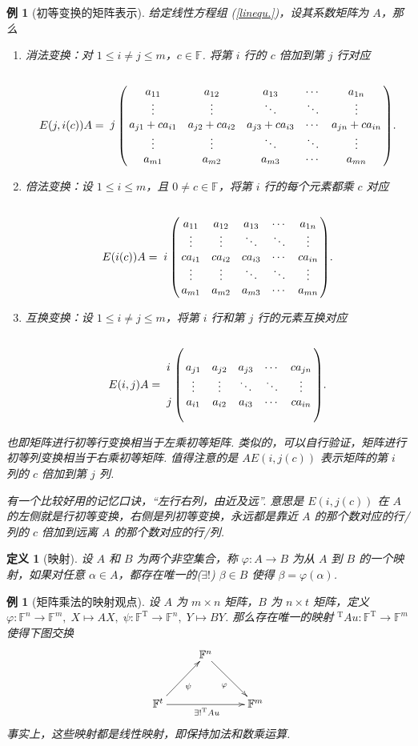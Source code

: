 \documentclass[10pt,openany]{article}
\theoremstyle{thmstyle} %
\theoremstyle{defstyle} %
\newtheorem{definition}[theorem]{定义}
\theoremstyle{prostyle} %
\theoremstyle{exastyle}
\newtheorem{example}[theorem]{例}
\theoremstyle{remstyle}
\newcommand{\T}{^{\text{T}}}
\newcommand{\F}{\mathbb{F}}
\begin{document}
\begin{example}[初等变换的矩阵表示]
	给定线性方程组 (\ref{linequ.})，设其系数矩阵为 \( A \)，那么
	\begin{enumerate}[(1)]
		\item 消法变换：对 \( 1 \leq i \neq j \leq m \)，\( c \in \F \). 将第 \( i \) 行的 \( c \) 倍加到第 \( j \) 行对应
		\[ E(j,i(c))A=\bordermatrix{
			&&&&& \cr
			&a_{11} & a_{12} & a_{13} & \cdots & a_{1n} \cr
			&\vdots & \vdots & \ddots & \ddots & \vdots \cr
			j &a_{j1}+ca_{i1} & a_{j2}+ca_{i2} & a_{j3}+ca_{i3} &  \cdots & a_{jn}+ca_{in} \cr
			&\vdots & \vdots & \ddots & \ddots & \vdots \cr
			&a_{m1} & a_{m2} & a_{m3} & \cdots & a_{mn}
		}. \]
		\item 倍法变换：设 \( 1 \leq i \leq m \)，且 \( 0 \neq c \in \F \)，将第 \( i \) 行的每个元素都乘 \( c \) 对应
		\[ E(i(c))A=\bordermatrix{
			&&&&& \cr
			&a_{11} & a_{12} & a_{13} & \cdots & a_{1n} \cr
			&\vdots & \vdots & \ddots & \ddots & \vdots \cr
			i &ca_{i1} & ca_{i2} & ca_{i3} &  \cdots & ca_{in} \cr
			&\vdots & \vdots & \ddots & \ddots & \vdots \cr
			&a_{m1} & a_{m2} & a_{m3} & \cdots & a_{mn}
		}.  \]
		\item 互换变换：设 \( 1 \leq i \neq j \leq m \)，将第 \( i \) 行和第 \( j \) 行的元素互换对应
		\[ E(i,j)A=\bordermatrix{
			&&&&& \cr
			&&&&& \cr
			i &a_{j1} & a_{j2} & a_{j3} &  \cdots & ca_{jn} \cr
			&\vdots & \vdots & \ddots & \ddots & \vdots \cr
			j &a_{i1} & a_{i2} & a_{i3} &  \cdots & ca_{in} \cr
			&&&&& 
		}.   \]
	\end{enumerate}
	
	也即矩阵进行初等行变换相当于左乘初等矩阵. 类似的，可以自行验证，矩阵进行初等列变换相当于右乘初等矩阵. 值得注意的是 \( AE(i,j(c)) \) 表示矩阵的第 \( i \) 列的 \( c \) 倍加到第 \( j \) 列. 
	
	有一个比较好用的记忆口诀，“左行右列，由近及远”. 意思是 \( E(i,j(c)) \) 在 \( A \) 的左侧就是行初等变换，右侧是列初等变换，永远都是靠近 \( A \) 的那个数对应的行/列的 \( c \) 倍加到远离 \( A \) 的那个数对应的行/列.
\end{example}

\begin{definition}[映射]
	设 \( A \) 和 \( B \) 为两个非空集合，称 \( \varphi:A \to B \) 为从 \( A \) 到 \( B \) 的一个映射，如果对任意 \( \alpha \in A \)，都存在唯一的(\( \exists !\)) \( \beta \in B \) 使得 \( \beta=\varphi(\alpha) \). 
\end{definition}


\begin{example}[矩阵乘法的映射观点]
	设 \( A \) 为 \( m \times n \) 矩阵，\( B \) 为 \( n \times t \) 矩阵，定义 \( \varphi: \F^n \to \F^m, \; X \mapsto AX, \; \psi: \F\T \to \F^n, \; Y \mapsto BY \). 那么存在唯一的映射 \( \T Au: \F\T \to \F^m \) 使得下图交换
	\[ \xymatrix@R=7ex@C=6ex{
		 & \F^n\ar"2,3"_{\varphi} & \\
		\F^t\ar"1,2"_{\psi}\ar"2,3"_{\exists ! \T Au} &  & \F^m\\
	} \]
	事实上，这些映射都是线性映射，即保持加法和数乘运算.
	\label{1.3.6}
\end{example}
\end{document}
